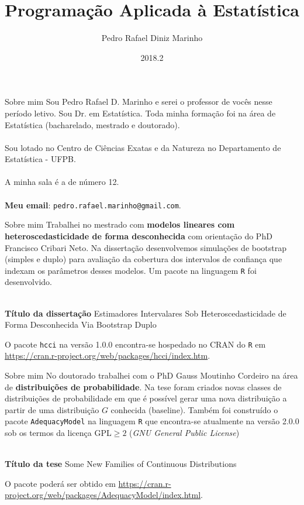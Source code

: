 \documentclass{beamer}
\begin{document}
	
	\title{Programação Aplicada à Estatística}
	\author{Pedro Rafael Diniz Marinho}
	\date{2018.2}
	
	\frame{\titlepage}


\begin{frame}{Sobre mim}
Sou Pedro Rafael D. Marinho e serei o professor de vocês nesse período letivo. Sou Dr. em Estatística. Toda minha formação foi na área de Estatística (bacharelado, mestrado e doutorado).\\~\\

Sou lotado no Centro de Ciências Exatas e da Natureza no Departamento de Estatística - UFPB. \\~\\

A minha sala é a de número 12.\\~\\

\textbf{Meu email}: \texttt{pedro.rafael.marinho@gmail.com}.
\end{frame}

\begin{frame}{Sobre mim}
Trabalhei no mestrado com \textbf{modelos lineares com heteroscedasticidade de forma desconhecida} com orientação do PhD Francisco Cribari Neto. Na dissertação desenvolvemos simulações de bootstrap (simples e duplo) para avaliação da cobertura dos intervalos de confiança que indexam os parâmetros desses modelos. Um pacote na linguagem \texttt{R} foi desenvolvido.\\~\\

\begin{block}{\textbf{Título da dissertação}}
Estimadores Intervalares Sob Heteroscedasticidade de Forma Desconhecida Via Bootstrap Duplo
\end{block}

O pacote \texttt{hcci} na versão 1.0.0 encontra-se hospedado no CRAN do \texttt{R} em \url{https://cran.r-project.org/web/packages/hcci/index.htm}.
\end{frame}

\begin{frame}{Sobre mim}
No doutorado trabalhei com o PhD Gauss Moutinho Cordeiro na área de \textbf{distribuições de probabilidade}. Na tese foram criados novas classes de distribuições de probabilidade em que é possível gerar uma nova distribuição a partir de uma distribuição $G$ conhecida (baseline). Também foi construído o pacote \texttt{AdequacyModel} na linguagem \texttt{R} que encontra-se atualmente na versão 2.0.0 sob os termos da licença GPL$\geq2$ (\textit{GNU General Public License})\\~\\

\begin{block}{\textbf{Título da tese}}	
Some New Families of Continuous Distributions
\end{block}
O pacote poderá ser obtido em \url{https://cran.r-project.org/web/packages/AdequacyModel/index.html}.
\end{frame}
\end{document}
